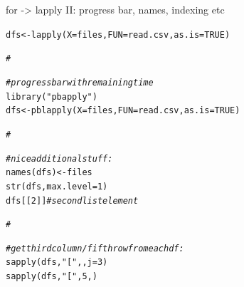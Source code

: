 \documentclass[xcolor=table,           xcolor=dvipsnames]{beamer}\usepackage[]{graphicx}\usepackage[]{color}
\makeatletter
\newcommand{\hlnum}[1]{\textcolor[rgb]{0,0,0}{#1}}
\newcommand{\hlstr}[1]{\textcolor[rgb]{0.545,0.137,0.137}{#1}}
\newcommand{\hlcom}[1]{\textcolor[rgb]{0,0.392,0}{\textit{#1}}}
\newcommand{\hlstd}[1]{\textcolor[rgb]{0,0,0}{#1}}
\newcommand{\hlkwb}[1]{\textcolor[rgb]{0,0,0}{#1}}
\newcommand{\hlkwc}[1]{\textcolor[rgb]{1,0,1}{#1}}
\newcommand{\hlkwd}[1]{\textcolor[rgb]{0,0,1}{#1}}
\newenvironment{kframe}{%
 \def\at@end@of@kframe{}%
 \ifinner\ifhmode%
  \def\at@end@of@kframe{\end{minipage}}%
  \begin{minipage}{\columnwidth}%
 \fi\fi%
 \def\FrameCommand##1{\hskip\@totalleftmargin \hskip-\fboxsep
 \colorbox{shadecolor}{##1}\hskip-\fboxsep
     \hskip-\linewidth \hskip-\@totalleftmargin \hskip\columnwidth}%
 \MakeFramed {\advance\hsize-\width
   \@totalleftmargin\z@ \linewidth\hsize
   \@setminipage}}%
 {\par\unskip\endMakeFramed%
 \at@end@of@kframe}
\newenvironment{knitrout}{}{} %
\makeatother
\begin{document}
\begin{frame}[fragile]{for -> lapply II: progress bar, names, indexing etc}
\vspace{-0.6em}
\begin{knitrout}
\color{fgcolor}\begin{kframe}
\begin{alltt}
\hlstd{dfs} \hlkwb{<-}   \hlkwd{lapply}\hlstd{(}\hlkwc{X}\hlstd{=files,} \hlkwc{FUN}\hlstd{=read.csv,} \hlkwc{as.is}\hlstd{=}\hlnum{TRUE}\hlstd{)}

\hlcom{#}
\end{alltt}
\end{kframe}
\end{knitrout}
\pause \vspace{-3.48em}
\begin{knitrout}
\color{fgcolor}\begin{kframe}
\begin{alltt}
\hlcom{# progress bar with remaining time}
\hlkwd{library}\hlstd{(}\hlstr{"pbapply"}\hlstd{)}
\hlstd{dfs} \hlkwb{<-} \hlkwd{pblapply}\hlstd{(}\hlkwc{X}\hlstd{=files,} \hlkwc{FUN}\hlstd{=read.csv,} \hlkwc{as.is}\hlstd{=}\hlnum{TRUE}\hlstd{)}

\hlcom{#}
\end{alltt}
\end{kframe}
\end{knitrout}
\pause \vspace{-3.48em}
\begin{knitrout}
\color{fgcolor}\begin{kframe}
\begin{alltt}
\hlcom{# nice additional stuff:}
\hlkwd{names}\hlstd{(dfs)} \hlkwb{<-} \hlstd{files}
\hlkwd{str}\hlstd{(dfs,} \hlkwc{max.level}\hlstd{=}\hlnum{1}\hlstd{)}
\hlstd{dfs[[}\hlnum{2}\hlstd{]]} \hlcom{# second list element}

\hlcom{#}
\end{alltt}
\end{kframe}
\end{knitrout}
\pause \vspace{-3.58em}
\begin{knitrout}
\color{fgcolor}\begin{kframe}
\begin{alltt}
\hlcom{# get third column / fifth row from each df:}
\hlkwd{sapply}\hlstd{(dfs,} \hlstr{"["}\hlstd{,  ,} \hlkwc{j}\hlstd{=}\hlnum{3}\hlstd{)}
\hlkwd{sapply}\hlstd{(dfs,} \hlstr{"["}\hlstd{,} \hlnum{5}\hlstd{,    )}
\end{alltt}
\end{kframe}
\end{knitrout}
\end{frame}
\end{document}
